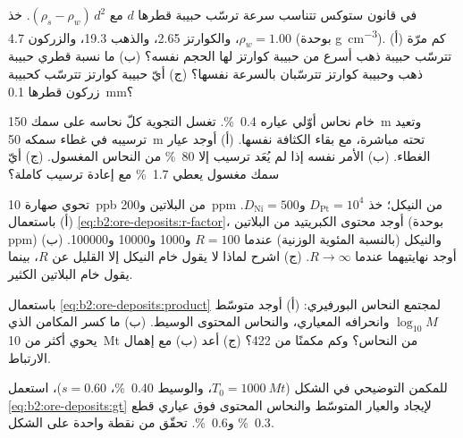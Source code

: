 \begin{exercise}[$\star$]\label{exo:b2:ore-deposits:3}
في قانون ستوكس تتناسب سرعة ترسّب حبيبة قطرها $d$ مع $(\rho_s -
\rho_w)\,d^2$. خذ $\rho_w = 1.00$، والكوارتز 2.65، والذهب 19.3، والزركون 4.7 (بوحدة
\unit{g.cm^{-3}}). (أ) كم مرّة تترسّب حبيبة ذهب أسرع من حبيبة كوارتز لها
الحجم نفسه؟ (ب) ما نسبة قطري حبيبة ذهب وحبيبة كوارتز تترسّبان
بالسرعة نفسها؟ (ج) أيّ حبيبة كوارتز تترسّب كحبيبة زركون قطرها \qty{0.1}{mm}؟
\end{exercise}

\begin{exercise}[$\star$]\label{exo:b2:ore-deposits:4}
خام نحاس أوّلي عياره \qty{0.4}{\percent}. تغسل التجوية كلّ نحاسه على
سمك \qty{150}{m} وتعيد ترسيبه في غطاء سمكه \qty{50}{m} تحته مباشرة، مع بقاء الكثافة
نفسها. (أ) أوجد عيار الغطاء. (ب) الأمر نفسه إذا لم يُعَد ترسيب إلا \qty{80}{\percent} من
النحاس المغسول. (ج) أيّ سمك مغسول يعطي \qty{1.7}{\percent} مع إعادة
ترسيب كاملة؟
\end{exercise}

\begin{exercise}[$\star\star$]\label{exo:b2:ore-deposits:5}
تحوي صهارة \qty{10}{ppb} من البلاتين و\qty{200}{ppm} من النيكل؛ خذ $D_{\mathrm{Pt}} =
10^4$ و$D_{\mathrm{Ni}} = 500$. (أ) باستعمال \eqref{eq:b2:ore-deposits:r-factor}، أوجد
محتوى الكبريتيد من البلاتين (بوحدة ppm) والنيكل (بالنسبة المئوية الوزنية) عندما $R = 100$ و\num{1000} و\num{10000}
و\num{100000}. (ب) أوجد نهايتيهما عندما $R \to \infty$. (ج) اشرح لماذا لا يقول خام النيكل
إلا القليل عن $R$، بينما يقول خام البلاتين الكثير.
\end{exercise}

\begin{exercise}[$\star\star$]\label{exo:b2:ore-deposits:6}
باستعمال \eqref{eq:b2:ore-deposits:product} لمجتمع النحاس البورفيري: (أ) أوجد متوسّط
$\log_{10} M$ وانحرافه المعياري، والنحاس المحتوى الوسيط. (ب) ما كسر المكامن
الذي يحوي أكثر من \qty{10}{Mt} من النحاس؟ وكم مكمنًا من 422؟ (ج) أعد (ب) مع إهمال الارتباط.
\end{exercise}

\begin{exercise}[$\star\star$]\label{exo:b2:ore-deposits:7}
للمكمن التوضيحي في الشكل ($T_0 = \qty{1000}{Mt}$، والوسيط \qty{0.40}{\percent}،
$s = 0.60$)، استعمل \eqref{eq:b2:ore-deposits:gt} لإيجاد  والعيار المتوسّط والنحاس المحتوى
فوق عياري قطع \qty{0.3}{\percent} و\qty{0.6}{\percent}. تحقّق من نقطة واحدة على الشكل.
\end{exercise}

